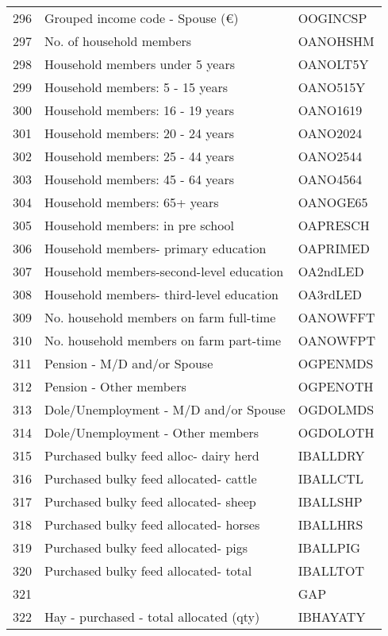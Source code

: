 \documentclass{article}\usepackage{graphicx, color}
\begin{document}
\begin{flushleft}
\begin{table}[ht]
\begin{center}
\begin{tabular}{rll}
  296 & Grouped income code - Spouse       (€) & OOGINCSP \\ 
  297 & No. of household members & OANOHSHM \\ 
  298 & Household members under 5 years & OANOLT5Y \\ 
  299 & Household members: 5 - 15 years & OANO515Y \\ 
  300 & Household members: 16 - 19 years & OANO1619 \\ 
  301 & Household members: 20 - 24 years & OANO2024 \\ 
  302 & Household members: 25 - 44 years & OANO2544 \\ 
  303 & Household members: 45 - 64 years & OANO4564 \\ 
  304 & Household members: 65+ years & OANOGE65 \\ 
  305 & Household members: in pre school & OAPRESCH \\ 
  306 & Household members- primary education & OAPRIMED \\ 
  307 & Household members-second-level education & OA2ndLED \\ 
  308 & Household members- third-level education & OA3rdLED \\ 
  309 & No. household members on farm full-time & OANOWFFT \\ 
  310 & No. household members on farm part-time & OANOWFPT \\ 
  311 & Pension - M/D and/or Spouse & OGPENMDS \\ 
  312 & Pension - Other members & OGPENOTH \\ 
  313 & Dole/Unemployment - M/D and/or Spouse & OGDOLMDS \\ 
  314 & Dole/Unemployment - Other members & OGDOLOTH \\ 
  315 & Purchased bulky feed alloc- dairy herd & IBALLDRY \\ 
  316 & Purchased bulky feed allocated- cattle & IBALLCTL \\ 
  317 & Purchased bulky feed allocated- sheep & IBALLSHP \\ 
  318 & Purchased bulky feed allocated- horses & IBALLHRS \\ 
  319 & Purchased bulky feed allocated- pigs & IBALLPIG \\ 
  320 & Purchased bulky feed allocated- total & IBALLTOT \\ 
  321 &  & GAP \\ 
  322 & Hay - purchased - total allocated  (qty) & IBHAYATY \\ 

\end{tabular}
\end{center}
\end{table}
\end{flushleft}
\end{document}
